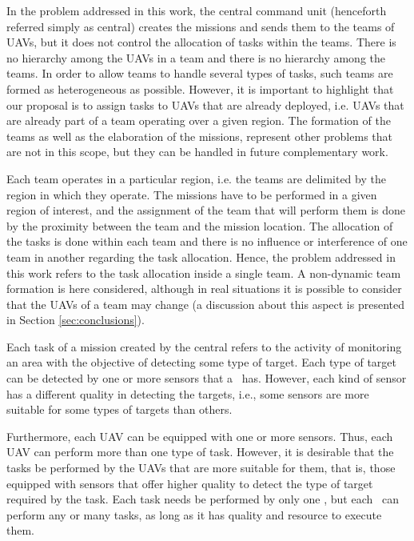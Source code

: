 In the problem addressed in this work, the central command unit (henceforth referred simply as central) creates the missions and sends them to the teams of UAVs, but it does not control the allocation of tasks within the teams. There is no hierarchy among the UAVs in a team and there is no hierarchy among the teams. In order to allow teams to handle several types of tasks, such teams are formed as heterogeneous as possible. However, it is important to highlight that our proposal is to assign tasks to UAVs that are already deployed, i.e. UAVs that are already part of a team operating over a given region. The formation of the teams as well as the elaboration of the missions, represent other problems that are not in this scope, but they can be handled in future complementary work.

Each team operates in a particular region, i.e. the teams are delimited by the region in which they operate. The missions have to be performed in a given region of interest, and the assignment of the team that will perform them is done by the proximity between the team and the mission location. The allocation of the tasks is done within each team and there is no influence or interference of one team in another regarding the task allocation. Hence, the problem addressed in this work refers to the task allocation inside a single team. A non-dynamic team formation is here considered, although in real situations it is possible to consider that the UAVs of a team may change (a discussion about this aspect is presented in Section \ref{sec:conclusions}).

Each task of a mission created by the central refers to the activity of monitoring an area with the objective of detecting some type of target. Each type of target can be detected by one or more sensors that a \uav\ has. However, each kind of sensor has a different quality in detecting the targets, i.e., some sensors are more suitable for some types of targets than others.

Furthermore, each UAV can be equipped with one or more sensors. Thus, each UAV can perform more than one type of task. However, it is desirable that the tasks be performed by the UAVs that are more suitable for them, that is, those equipped with sensors that offer higher quality to detect the type of target required by the task. Each task needs be performed by only one \uav, but each \uav\ can perform any or many tasks, as long as it has quality and resource to execute them. 

